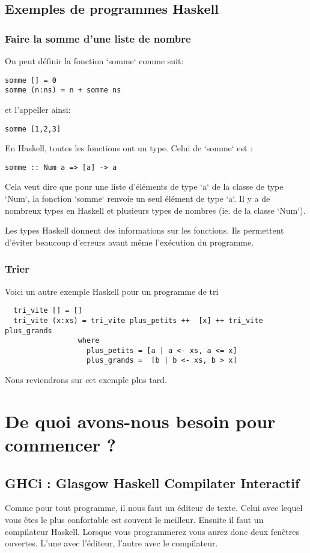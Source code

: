 \documentclass[11pt]{article}
\begin{document}
\subsection{Exemples de programmes Haskell}
\label{sec:org73f3141}

\subsubsection{Faire la somme d'une liste de nombre}
\label{sec:org39aebf9}
On peut définir la fonction `somme` comme suit:
\begin{verbatim}
somme [] = 0
somme (n:ns) = n + somme ns
\end{verbatim}
et l'appeller ainsi:
\begin{verbatim}
somme [1,2,3]
\end{verbatim}


En Haskell, toutes les fonctions ont un type. Celui de `somme` est :
\begin{verbatim}
somme :: Num a => [a] -> a
\end{verbatim}


Cela veut dire que pour une liste d'éléments de type `a` de la classe de type `Num`,  la fonction `somme` renvoie un seul élément de type `a`.   Il y a de nombreux types en Haskell et plusieurs types de nombres (ie. de la classe `Num`).

Les types Haskell donnent des informations sur les fonctions. Ils permettent d'éviter beaucoup d'erreurs avant même l'exécution du programme.

\subsubsection{Trier}
\label{sec:org5d66497}
Voici un autre exemple Haskell pour un programme de tri
\begin{verbatim}
  tri_vite [] = []
  tri_vite (x:xs) = tri_vite plus_petits ++  [x] ++ tri_vite plus_grands
                 where
                   plus_petits = [a | a <- xs, a <= x]
                   plus_grands =  [b | b <- xs, b > x]
\end{verbatim}
Nous reviendrons sur cet exemple plus tard.

\section{De quoi avons-nous besoin pour commencer ?}
\label{sec:org28acb68}
\subsection{GHCi : Glasgow Haskell Compilater Interactif}
\label{sec:orgfa96fa9}
Comme pour tout programme, il nous faut un éditeur de texte.  Celui avec lequel vous êtes le plus confortable est souvent le meilleur.  Ensuite il faut un compilateur Haskell.  Lorsque vous programmerez vous aurez donc deux fenêtres ouvertes. L'une avec l'éditeur, l'autre avec le compilateur.
\end{document}
